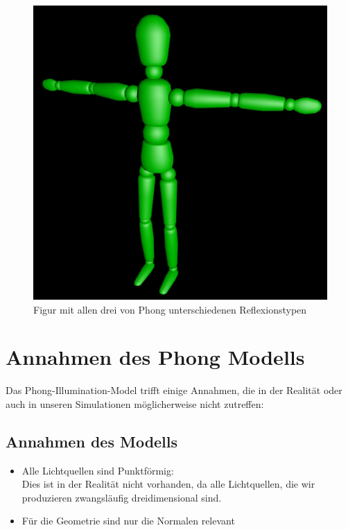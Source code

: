 \documentclass[a4paper]{scrartcl}%
\begin{document}
        \begin{figure}[H]
            \centering
            \includegraphics[scale=0.2]{./possible-images/light-types/all.jpg}
            \caption{Figur mit allen drei von Phong unterschiedenen Reflexionstypen}
            \label{fig:./possible-images/light-types/all}
        \end{figure}
        
    
\section{Annahmen des Phong Modells}%
\label{sec:annahmen_des_phong_modells}
    Das Phong-Illumination-Model trifft einige Annahmen, die in der Realität oder auch in unseren Simulationen möglicherweise nicht zutreffen:\\

    \subsection{Annahmen des Modells}%
    \label{sub:annahmen_des_modells}
    
        \begin{itemize}
            \item Alle Lichtquellen sind Punktförmig:\\
                Dies ist in der Realität nicht vorhanden, da alle Lichtquellen, die wir produzieren zwangsläufig dreidimensional sind.\\
            \item Für die Geometrie sind nur die Normalen relevant\\
        \end{itemize}
    
\end{document}
